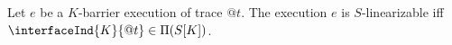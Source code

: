 \vspace{-1mm}
\begin{proposition}\label{prop:lin}
Let $e$ be a $K$-barrier execution of trace $@t$. The execution $e$ is $S$-linearizable iff $\interfaceInd{K}{@t}\in\Pi(S[K])$.
\vspace{-1mm}
\end{proposition}

